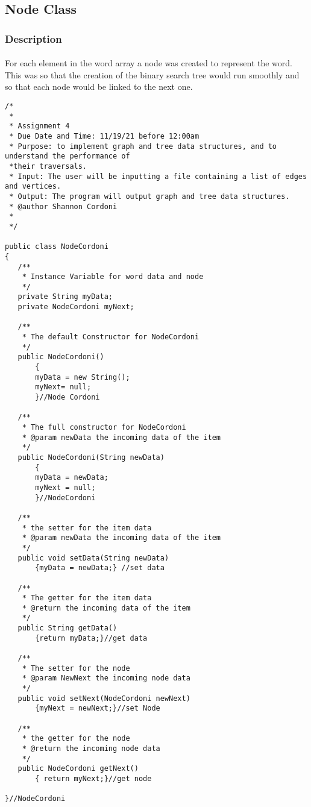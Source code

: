 \documentclass[letterpaper, 10pt,DIV=13]{scrartcl}
\numberwithin{equation}{section} %
\numberwithin{figure}{section} %
\numberwithin{table}{section} %
\begin{document}
\subsection{Node Class}

\subsubsection{Description}
\paragraph{} For each element in the word array a node was created to represent the word. This was so that the creation of the binary search tree would run smoothly and so that each node  would be linked to the next one.

\lstset{numbers=left, numberstyle=\tiny, stepnumber=1, numbersep=5pt, basicstyle=\footnotesize\ttfamily}
\begin{lstlisting}[frame=single, ]
/*
 * 
 * Assignment 4
 * Due Date and Time: 11/19/21 before 12:00am 
 * Purpose: to implement graph and tree data structures, and to understand the performance of 
 *their traversals.
 * Input: The user will be inputting a file containing a list of edges and vertices. 
 * Output: The program will output graph and tree data structures. 
 * @author Shannon Cordoni 
 * 
 */

public class NodeCordoni 
{
   /**
    * Instance Variable for word data and node 
    */
   private String myData;
   private NodeCordoni myNext;
   
   /**
    * The default Constructor for NodeCordoni
    */
   public NodeCordoni()
       {
       myData = new String();
       myNext= null;
       }//Node Cordoni
   
   /**
    * The full constructor for NodeCordoni
    * @param newData the incoming data of the item
    */
   public NodeCordoni(String newData)
       {
       myData = newData;
       myNext = null;
       }//NodeCordoni
   
   /**
    * the setter for the item data
    * @param newData the incoming data of the item
    */
   public void setData(String newData)
       {myData = newData;} //set data
   
   /**
    * The getter for the item data
    * @return the incoming data of the item
    */
   public String getData()
       {return myData;}//get data
   
   /**
    * The setter for the node
    * @param NewNext the incoming node data
    */
   public void setNext(NodeCordoni newNext)
       {myNext = newNext;}//set Node
   
   /**
    * the getter for the node
    * @return the incoming node data
    */
   public NodeCordoni getNext()
       { return myNext;}//get node

}//NodeCordoni
\end{lstlisting}
\end{document}
